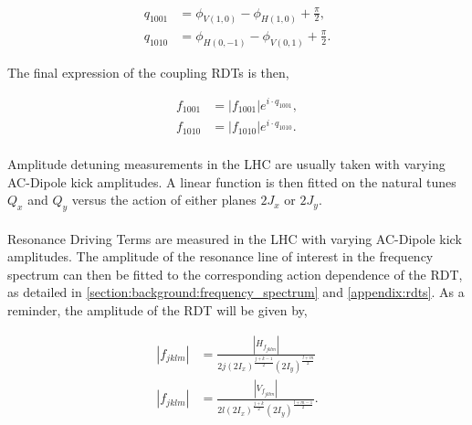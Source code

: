 \begin{equation}
    \begin{aligned}
        q_{1001} &= \phi_{V(1,0)}  - \phi_{H(1,0)} + \frac{\pi}{2}, \\
        q_{1010} &= \phi_{H(0,-1)} - \phi_{V(0,1)} + \frac{\pi}{2}.
    \end{aligned}
\end{equation}

The final expression of the coupling RDTs is then,

\begin{equation}
    \begin{aligned}
        f_{1001} &= |f_{1001}|e^{i\cdot q_{1001}},\\
        f_{1010} &= |f_{1010}|e^{i\cdot q_{1010}}.
    \end{aligned}
\end{equation}


\paragraph{}
Amplitude detuning measurements in the LHC are usually taken with varying AC-Dipole kick amplitudes.
A linear function is then fitted on the natural tunes $Q_x$ and $Q_y$ versus the action of either
planes $2J_x$ or $2J_y$.


\paragraph{}
Resonance Driving Terms are measured in the LHC with varying AC-Dipole kick amplitudes. The
amplitude of the resonance line of interest in the frequency spectrum can then be fitted to the
corresponding action dependence of the RDT, as detailed in
\cref{section:background:frequency_spectrum} and \cref{appendix:rdts}. As a reminder, the amplitude
of the RDT will be given by,

\begin{equation}
    \begin{aligned}
    |f_{jklm}| &= \frac{|H_{f_{jklm}}|}{2 j (2 I_x)^\frac{j+k-1}{2} (2 I_y)^\frac{l+m}{2}} \\
    |f_{jklm}| &= \frac{|V_{f_{jklm}}|}{2 l (2 I_x)^\frac{j+k}{2} (2 I_y)^\frac{l+m-1}{2}} .
    \end{aligned}
    \nonumber
\end{equation}

